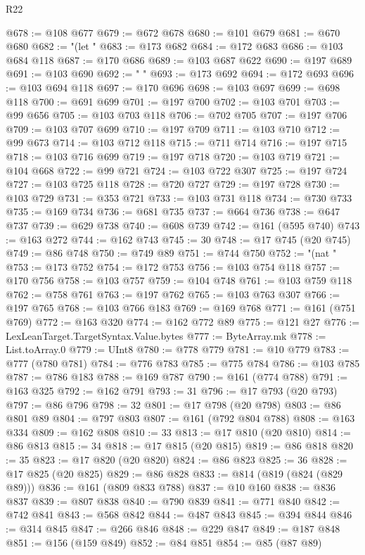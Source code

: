 \begin{lexlean}{R22}
\begin{coremodule}
@678 := @108 @677
@679 := @672 @678
@680 := @101 @679
@681 := @670 @680
@682 := "(let "
@683 := @173 @682
@684 := @172 @683
@686 := @103 @684 @118
@687 := @170 @686
@689 := @103 @687 @622
@690 := @197 @689
@691 := @103 @690
@692 := " "
@693 := @173 @692
@694 := @172 @693
@696 := @103 @694 @118
@697 := @170 @696
@698 := @103 @697
@699 := @698 @118
@700 := @691 @699
@701 := @197 @700
@702 := @103 @701
@703 := @99 @656
@705 := @103 @703 @118
@706 := @702 @705
@707 := @197 @706
@709 := @103 @707 @699
@710 := @197 @709
@711 := @103 @710
@712 := @99 @673
@714 := @103 @712 @118
@715 := @711 @714
@716 := @197 @715
@718 := @103 @716 @699
@719 := @197 @718
@720 := @103 @719
@721 := @104 @668
@722 := @99 @721
@724 := @103 @722 @307
@725 := @197 @724
@727 := @103 @725 @118
@728 := @720 @727
@729 := @197 @728
@730 := @103 @729
@731 := @353 @721
@733 := @103 @731 @118
@734 := @730 @733
@735 := @169 @734
@736 := @681 @735
@737 := @664 @736
@738 := @647 @737
@739 := @629 @738
@740 := @608 @739
@742 := @161 (@595 @740)
@743 := @163 @272
@744 := @162 @743
@745 := 30
@748 := @17 @745 (@20 @745)
@749 := @86 @748
@750 := @749 @89
@751 := @744 @750
@752 := "(nat "
@753 := @173 @752
@754 := @172 @753
@756 := @103 @754 @118
@757 := @170 @756
@758 := @103 @757
@759 := @104 @748
@761 := @103 @759 @118
@762 := @758 @761
@763 := @197 @762
@765 := @103 @763 @307
@766 := @197 @765
@768 := @103 @766 @183
@769 := @169 @768
@771 := @161 (@751 @769)
@772 := @163 @320
@774 := @162 @772 @89
@775 := @121 @27
@776 := LexLeanTarget.TargetSyntax.Value.bytes
@777 := ByteArray.mk
@778 := List.toArray.{0}
@779 := UInt8
@780 := @778 @779
@781 := @10 @779
@783 := @777 (@780 @781)
@784 := @776 @783
@785 := @775 @784
@786 := @103 @785
@787 := @786 @183
@788 := @169 @787
@790 := @161 (@774 @788)
@791 := @163 @325
@792 := @162 @791
@793 := 31
@796 := @17 @793 (@20 @793)
@797 := @86 @796
@798 := 32
@801 := @17 @798 (@20 @798)
@803 := @86 @801 @89
@804 := @797 @803
@807 := @161 (@792 @804 @788)
@808 := @163 @334
@809 := @162 @808
@810 := 33
@813 := @17 @810 (@20 @810)
@814 := @86 @813
@815 := 34
@818 := @17 @815 (@20 @815)
@819 := @86 @818
@820 := 35
@823 := @17 @820 (@20 @820)
@824 := @86 @823
@825 := 36
@828 := @17 @825 (@20 @825)
@829 := @86 @828
@833 := @814 (@819 (@824 (@829 @89)))
@836 := @161 (@809 @833 @788)
@837 := @10 @160
@838 := @836 @837
@839 := @807 @838
@840 := @790 @839
@841 := @771 @840
@842 := @742 @841
@843 := @568 @842
@844 := @487 @843
@845 := @394 @844
@846 := @314 @845
@847 := @266 @846
@848 := @229 @847
@849 := @187 @848
@851 := @156 (@159 @849)
@852 := @84 @851
@854 := @85 (@87 @89)

\end{coremodule}
\end{lexlean}
